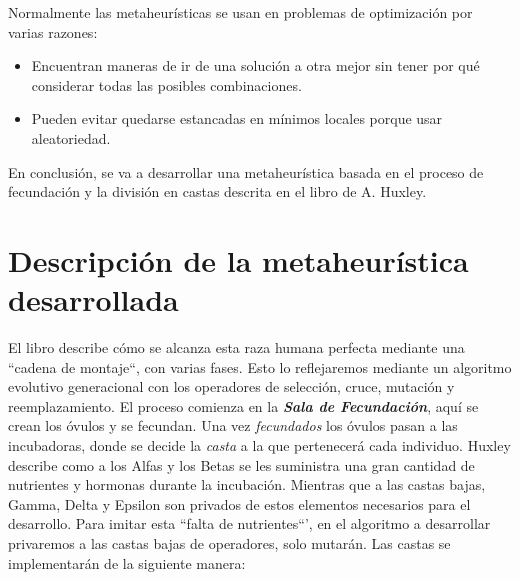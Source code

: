 Normalmente las metaheurísticas se usan en problemas de optimización por varias razones:
\begin{itemize}
    \item Encuentran maneras de ir de una solución a otra mejor sin tener por qué considerar todas las posibles combinaciones. 
    \item Pueden evitar quedarse estancadas en mínimos locales porque usar aleatoriedad.
\end{itemize}

En conclusión, se va a desarrollar una metaheurística basada en el proceso de fecundación y la división en castas descrita en el libro de A. Huxley.

\section{Descripción de la metaheurística desarrollada}

El libro describe cómo se alcanza esta raza humana perfecta mediante una ``cadena de montaje``, con varias fases. Esto lo reflejaremos mediante 
un algoritmo evolutivo generacional con los operadores de selección, cruce, mutación y reemplazamiento. El proceso comienza en la \textbf{\textit{Sala de Fecundación}}, 
aquí se crean los óvulos y se fecundan. Una vez \textit{fecundados} los óvulos pasan a las incubadoras, donde se decide la \textit{casta} a la que pertenecerá cada individuo. Huxley
describe como a los Alfas y los Betas se les suministra una gran cantidad de nutrientes y hormonas durante la incubación. Mientras que a las castas bajas, Gamma, Delta y
Epsilon son privados de estos elementos necesarios para el desarrollo. Para imitar esta ``falta de nutrientes``', en el algoritmo a desarrollar privaremos a las castas bajas de
operadores, solo mutarán. Las castas se implementarán de la siguiente manera: 

